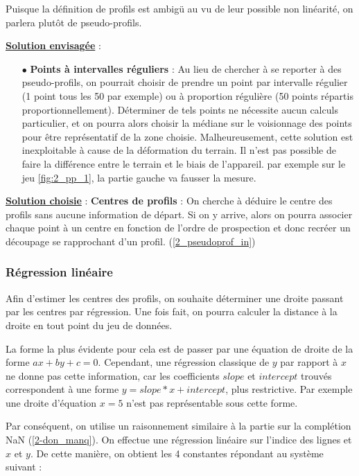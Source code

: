 \documentclass[12pt]{article}
\begin{document}
    Puisque la définition de profils est ambigü au vu de leur possible non linéarité, on parlera plutôt de pseudo-profils.

    \noindent\textbf{\underline{Solution envisagée}} :
    \begin{enumerate}
        \item[$\bullet$] \textbf{Points à intervalles réguliers} : Au lieu de chercher à se reporter à des pseudo-profils, on pourrait choisir de prendre un point par intervalle régulier (1 point tous les 50 par exemple) ou à proportion régulière (50 points répartis proportionnellement). Déterminer de tels points ne nécessite aucun calculs particulier, et on pourra alors choisir la médiane sur le voisionnage des points pour être représentatif de la zone choisie. Malheureusement, cette solution est inexploitable à cause de la déformation du terrain. Il n'est pas possible de faire la différence entre le terrain et le biais de l'appareil. par exemple sur le jeu \ref{fig:2_pp_1}, la partie gauche va fausser la mesure.
    \end{enumerate}
    \textbf{\underline{Solution choisie}} : \textbf{Centres de profils} : \label{2_pseudoprof_out} On cherche à déduire le centre des profils sans aucune information de départ. Si on y arrive, alors on pourra associer chaque point à un centre en fonction de l'ordre de prospection et donc recréer un découpage se rapprochant d'un profil. (\ref{2_pseudoprof_in})

    \subsubsection{Régression linéaire}

    Afin d'estimer les centres des profils, on souhaite déterminer une droite passant par les centres par régression. Une fois fait, on pourra calculer la distance à la droite en tout point du jeu de données.

    La forme la plus évidente pour cela est de passer par une équation de droite de la forme $ax + by + c = 0$. Cependant, une régression classique de $y$ par rapport à $x$ ne donne pas cette information, car les coefficients $slope$ et $intercept$ trouvés correspondent à une forme $y = slope*x + intercept$, plus restrictive. Par exemple une droite d'équation $x = 5$ n'est pas représentable sous cette forme.

    Par conséquent, on utilise un raisonnement similaire à la partie sur la complétion NaN (\ref{2-don_manq}). On effectue une régression linéaire sur l'indice des lignes et $x$ et $y$. De cette manière, on obtient les 4 constantes répondant au système suivant :
\end{document}
